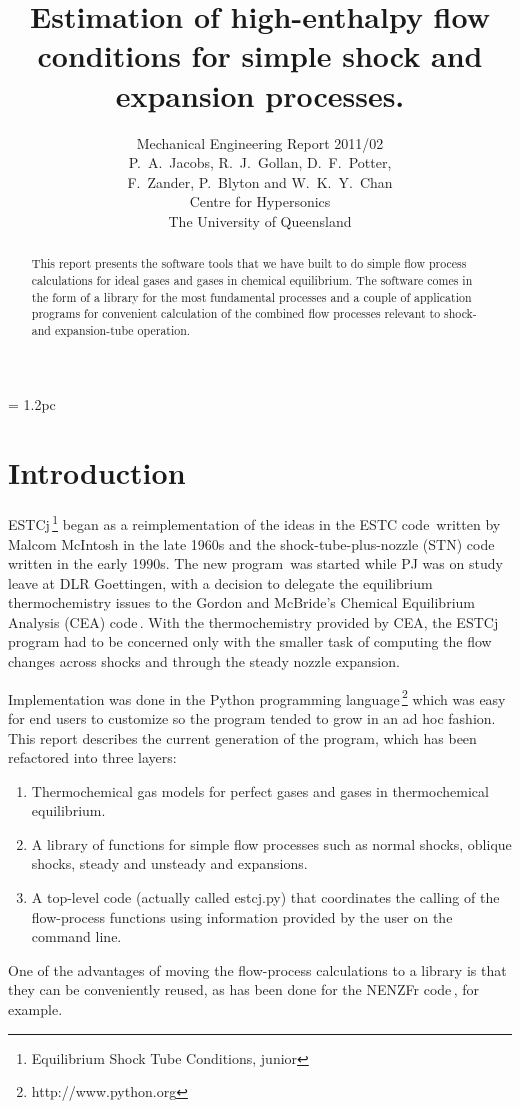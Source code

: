 \documentclass[10pt,a4paper]{article}
\title{
  Estimation of high-enthalpy flow conditions
  for simple shock and expansion processes.
}
\author{
  Mechanical Engineering Report 2011/02 \\
  P.~A.~Jacobs, R.~J.~Gollan, D.~F.~Potter, \\
  F.~Zander, P.~Blyton and W.~K.~Y.~Chan \\
  Centre for Hypersonics\\
  The University of Queensland
}
\begin{document}
\maketitle

\baselineskip = 1.2pc

\begin{abstract}
This report presents the software tools that we have built to do simple
flow process calculations for ideal gases and gases in chemical equilibrium.
The software comes in the form of a library for the most fundamental processes and
a couple of application programs for convenient calculation of 
the combined flow processes relevant to shock- and expansion-tube operation.
\end{abstract}

\bigskip
\tableofcontents


\newpage
\section{Introduction}
%
ESTCj\,\footnote{Equilibrium Shock Tube Conditions, junior} 
began as a reimplementation of the ideas in the ESTC code\,\cite{mcintosh_70}
written by Malcom McIntosh in the late 1960s and 
the shock-tube-plus-nozzle (STN) code\,\cite{krek_jacobs_93} written in the early 1990s.
The new program\,\cite{jacobs_gardner_2003a} was started 
while PJ was on study leave at DLR Goettingen,
with a decision to delegate the equilibrium thermochemistry issues to the 
Gordon and McBride's Chemical Equilibrium Analysis (CEA) 
code\,\cite{gordon_mcbride_1994,mcbride_gordon_1996}.
With the thermochemistry provided by CEA, the ESTCj program had to be concerned
only with the smaller task of computing the flow changes across shocks and through
the steady nozzle expansion.

\medskip
Implementation was done in the Python programming language\,\footnote{http://www.python.org}
which was easy for end users to customize so the program tended to grow in an ad hoc fashion.
This report describes the current generation of the program, which has been refactored into
three layers:
\begin{enumerate}
 \item Thermochemical gas models for perfect gases and gases in thermochemical equilibrium.
 \item A library of functions for simple flow processes such as normal shocks, oblique shocks,
  steady and unsteady and expansions.
 \item A top-level code (actually called estcj.py) that coordinates the calling 
  of the flow-process functions using information provided by the user on the command line.
\end{enumerate}
One of the advantages of moving the flow-process calculations to a library is that 
they can be conveniently reused, 
as has been done for the NENZFr code\,\cite{doherty_etal_2012a}, for example.
\end{document}
